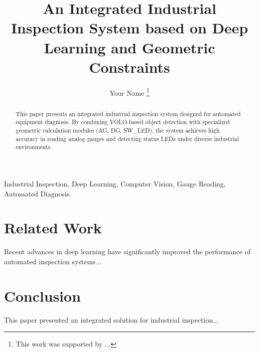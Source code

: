 \documentclass[journal]{IEEEtran}
\title{An Integrated Industrial Inspection System based on Deep Learning and Geometric Constraints}
\author{Your Name
\thanks{This work was supported by ...}}
\begin{document}
\maketitle

\begin{abstract}
This paper presents an integrated industrial inspection system designed for automated equipment diagnosis. By combining YOLO-based object detection with specialized geometric calculation modules (AG, DG, SW\_LED), the system achieves high accuracy in reading analog gauges and detecting status LEDs under diverse industrial environments. 
\end{abstract}

\begin{IEEEkeywords}
Industrial Inspection, Deep Learning, Computer Vision, Gauge Reading, Automated Diagnosis.
\end{IEEEkeywords}



\section{Related Work}
\label{sec:related_work}
Recent advances in deep learning have significantly improved the performance of automated inspection systems...





\section{Conclusion}
\label{sec:conclusion}
This paper presented an integrated solution for industrial inspection...



\end{document}
